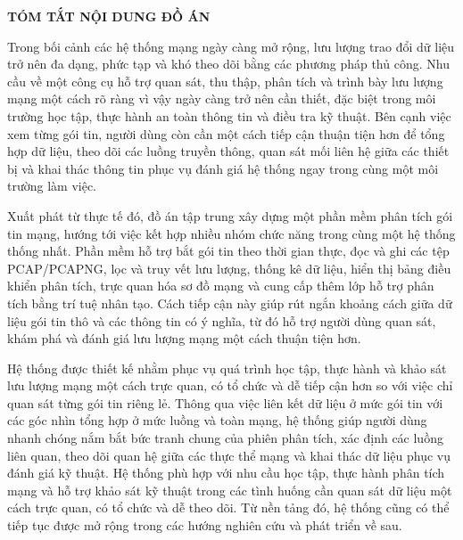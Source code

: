 \documentclass[../DoAn.tex]{subfiles}
\begin{document}
\begin{center}
\Large{\textbf{TÓM TẮT NỘI DUNG ĐỒ ÁN}}\\
\end{center}

Trong bối cảnh các hệ thống mạng ngày càng mở rộng, lưu lượng trao đổi dữ liệu trở nên đa dạng, phức tạp và khó theo dõi bằng các phương pháp thủ công. Nhu cầu về một công cụ hỗ trợ quan sát, thu thập, phân tích và trình bày lưu lượng mạng một cách rõ ràng vì vậy ngày càng trở nên cần thiết, đặc biệt trong môi trường học tập, thực hành an toàn thông tin và điều tra kỹ thuật. Bên cạnh việc xem từng gói tin, người dùng còn cần một cách tiếp cận thuận tiện hơn để tổng hợp dữ liệu, theo dõi các luồng truyền thông, quan sát mối liên hệ giữa các thiết bị và khai thác thông tin phục vụ đánh giá hệ thống ngay trong cùng một môi trường làm việc.

Xuất phát từ thực tế đó, đồ án tập trung xây dựng một phần mềm phân tích gói tin mạng, hướng tới việc kết hợp nhiều nhóm chức năng trong cùng một hệ thống thống nhất. Phần mềm hỗ trợ bắt gói tin theo thời gian thực, đọc và ghi các tệp PCAP/PCAPNG, lọc và truy vết lưu lượng, thống kê dữ liệu, hiển thị bảng điều khiển phân tích, trực quan hóa sơ đồ mạng và cung cấp thêm lớp hỗ trợ phân tích bằng trí tuệ nhân tạo. Cách tiếp cận này giúp rút ngắn khoảng cách giữa dữ liệu gói tin thô và các thông tin có ý nghĩa, từ đó hỗ trợ người dùng quan sát, khám phá và đánh giá lưu lượng mạng một cách thuận tiện hơn.

Hệ thống được thiết kế nhằm phục vụ quá trình học tập, thực hành và khảo sát lưu lượng mạng một cách trực quan, có tổ chức và dễ tiếp cận hơn so với việc chỉ quan sát từng gói tin riêng lẻ. Thông qua việc liên kết dữ liệu ở mức gói tin với các góc nhìn tổng hợp ở mức luồng và toàn mạng, hệ thống giúp người dùng nhanh chóng nắm bắt bức tranh chung của phiên phân tích, xác định các luồng liên quan, theo dõi quan hệ giữa các thực thể mạng và khai thác dữ liệu phục vụ đánh giá kỹ thuật. Hệ thống phù hợp với nhu cầu học tập, thực hành phân tích mạng và hỗ trợ khảo sát kỹ thuật trong các tình huống cần quan sát dữ liệu một cách trực quan, có tổ chức và dễ theo dõi. Từ nền tảng đó, hệ thống cũng có thể tiếp tục được mở rộng trong các hướng nghiên cứu và phát triển về sau.
\end{document}
